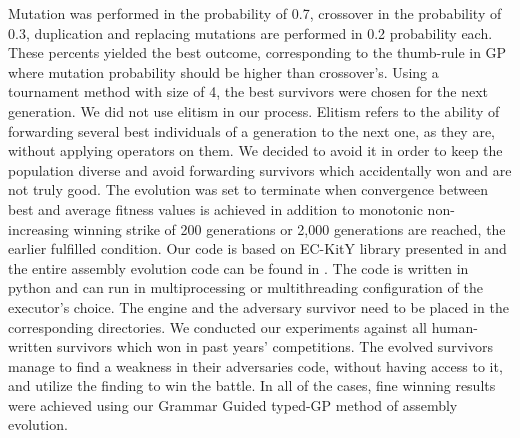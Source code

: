 \documentclass[dvipsnames,format=sigconf,anonymous=true,review=true]{acmart}
\begin{document}
Mutation was performed in the probability of 0.7, crossover in the probability of 0.3, duplication and replacing mutations are performed in 0.2 probability each. These percents yielded the best outcome, corresponding to the thumb-rule in GP where mutation probability should be higher than crossover's.
Using a tournament method with size of 4, the best survivors were chosen for the next generation. We did not use elitism in our process. Elitism refers to the ability of forwarding several best individuals of a generation to the next one, as they are, without applying operators on them. We decided to avoid it in order to keep the population diverse and avoid forwarding survivors which accidentally won and are not truly good.
The evolution was set to terminate when convergence between best and average fitness values is achieved in addition to monotonic non-increasing winning strike of 200 generations or 2,000 generations are reached, the earlier fulfilled condition.
Our code is based on EC-KitY library presented in \cite{eckity2022git} and the entire assembly evolution code can be found in \cite{AssemblyCodeGeneration}. The code is written in python and can run in multiprocessing or multithreading configuration of the executor's choice. The engine and the adversary survivor need to be placed in the corresponding directories.
We conducted our experiments against all human-written survivors which won in past years' competitions. The evolved survivors manage to find a weakness in their adversaries code, without having access to it, and utilize the finding to win the battle. In all of the cases, fine winning results were achieved using our Grammar Guided typed-GP method of assembly evolution.
\end{document}
